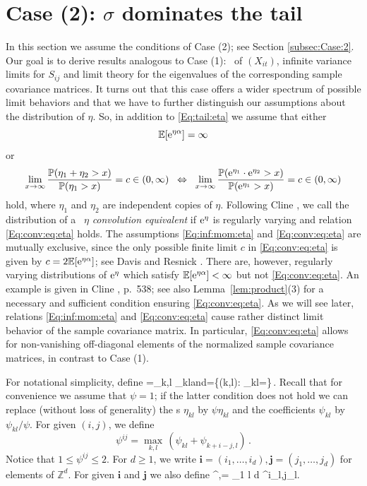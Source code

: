 \section{Case (2): $\sigma$ dominates the tail}\label{Sec:case2}
In this section we assume the conditions of Case (2); see Section \ref{subsec:Case:2}. Our goal is to derive results analogous to Case (1): \regvar\ 
of $(X_{it})$, infinite variance limits for $S_{ij}$ and limit theory for the eigenvalues of the corresponding sample 
covariance matrices. It turns out that this case offers a wider spectrum of possible limit behaviors and that we have to further distinguish our assumptions about the distribution of $\eta$. So, in addition to \eqref{Eq:tail:eta} we assume that either
\begin{equation}\label{Eq:inf:mom:eta} {\mathbb E}[{\rm e}^{\eta \alpha}]=\infty\end{equation}
or 
\begin{equation}\label{Eq:conv:eq:eta} \lim_{x \to \infty}\frac{{\mathbb P}(\eta_1+\eta_2>x)}{{\mathbb P}(\eta_1>x)}=c \in (0,\infty) \;\; \Leftrightarrow\;\; \lim_{x \to \infty}\frac{{\mathbb P}({\rm e}^{\eta_1}\cdot {\rm e}^{\eta_2}>x)}{{\mathbb P}({\rm e}^{\eta_1}>x)}=c \in (0,\infty)\end{equation}
hold, where $\eta_1$ and $\eta_2$ are independent copies of $\eta$.
\bre Following  Cline \cite{cline:1986}, we call 
the distribution of a \rv\ $\eta$ {\it convolution equivalent} if  ${\rm e}^\eta$ is regularly varying and
relation \eqref{Eq:conv:eq:eta} holds. The assumptions \eqref{Eq:inf:mom:eta} and \eqref{Eq:conv:eq:eta} are mutually exclusive, since the only possible finite limit $c$ in \eqref{Eq:conv:eq:eta} is given by $c=2{\mathbb E}[{\rm e}^{\eta \alpha}]$; see Davis and Resnick \cite{davis:resnick:1986}. There are, however, 
regularly varying distributions of ${\rm e}^\eta$ which satisfy ${\mathbb E}[{\rm e}^{\eta \alpha}]<\infty$ but not
\eqref{Eq:conv:eq:eta}. An example is given in Cline \cite{cline:1986}, p.\ 538;  see also Lemma~\ref{lem:product}(3) 
for a necessary and sufficient condition ensuring \eqref{Eq:conv:eq:eta}.
\ere
As we will see later, relations \eqref{Eq:inf:mom:eta} and \eqref{Eq:conv:eq:eta} cause
rather distinct limit behavior of the sample covariance matrix. In particular, \eqref{Eq:conv:eq:eta}
allows for non-vanishing off-diagonal elements of the normalized sample  covariance matrices, in contrast to Case (1). 
\par
For notational simplicity, define
\beao
\psi=\max_{k,l} \psi_{kl}\qquad \mbox{and}\qquad \Lambda=\{(k,l): \psi_{kl}=\psi\}\,.
\eeao
Recall that for convenience we assume that $\psi=1$; if the latter condition does not hold we can replace  
(without loss of generality) the \rv s $\eta_{kl}$ by $\psi \eta_{kl}$ and the coefficients $\psi_{kl}$ by $\psi_{kl}/\psi$.
For given $(i,j)$, we define 
\begin{equation} \label{eq:psi:ij:def}
\psi^{ij}= \max_{k,l}\, (\psi_{kl}+\psi_{k+i-j,l})\,.
\end{equation}
Notice that $1\le \psi^{ij}\le 2$. For $d\ge 1$, we write $\mathbf{i}=(i_1, \ldots, i_d), \mathbf{j}=(j_1, \ldots, j_d)$ for elements of $\mathbb{Z}^d$. For given  $\mathbf{i}$ and  $\mathbf{j}$ we also define
\beao
\psi^{,}= \max_{1 \leq l \leq d} \psi^{i_l,j_l}.
\eeao
 

